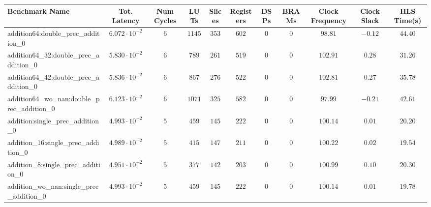 \begin{tabular}{|l|c|c|c|c|c|c|c|c|c|c|}
\hline
Benchmark Name                                            & Tot. Latency            & Num Cycles & LUTs       & Slices    & Registers & DSPs    & BRAMs & Clock Frequency & Clock Slack & HLS Time(s) \\
\hline
addition64:double\_prec\_addition\_0                      & $ 6.072 \cdot 10^{-2} $ & $ 6      $ & $ 1145   $ & $ 353   $ & $ 602   $ & $ 0   $ & $ 0 $ & $ 98.81       $ & $ -0.12   $ & $ 44.40   $ \\
addition64\_32:double\_prec\_addition\_0                  & $ 5.830 \cdot 10^{-2} $ & $ 6      $ & $ 789    $ & $ 261   $ & $ 519   $ & $ 0   $ & $ 0 $ & $ 102.91      $ & $ 0.28    $ & $ 31.26   $ \\
addition64\_42:double\_prec\_addition\_0                  & $ 5.836 \cdot 10^{-2} $ & $ 6      $ & $ 867    $ & $ 276   $ & $ 522   $ & $ 0   $ & $ 0 $ & $ 102.81      $ & $ 0.27    $ & $ 35.78   $ \\
addition64\_wo\_nan:double\_prec\_addition\_0             & $ 6.123 \cdot 10^{-2} $ & $ 6      $ & $ 1071   $ & $ 325   $ & $ 582   $ & $ 0   $ & $ 0 $ & $ 97.99       $ & $ -0.21   $ & $ 42.61   $ \\
addition:single\_prec\_addition\_0                        & $ 4.993 \cdot 10^{-2} $ & $ 5      $ & $ 459    $ & $ 145   $ & $ 222   $ & $ 0   $ & $ 0 $ & $ 100.14      $ & $ 0.01    $ & $ 20.20   $ \\
addition\_16:single\_prec\_addition\_0                    & $ 4.989 \cdot 10^{-2} $ & $ 5      $ & $ 415    $ & $ 147   $ & $ 211   $ & $ 0   $ & $ 0 $ & $ 100.22      $ & $ 0.02    $ & $ 19.54   $ \\
addition\_8:single\_prec\_addition\_0                     & $ 4.951 \cdot 10^{-2} $ & $ 5      $ & $ 377    $ & $ 142   $ & $ 203   $ & $ 0   $ & $ 0 $ & $ 100.99      $ & $ 0.10    $ & $ 20.30   $ \\
addition\_wo\_nan:single\_prec\_addition\_0               & $ 4.993 \cdot 10^{-2} $ & $ 5      $ & $ 459    $ & $ 145   $ & $ 222   $ & $ 0   $ & $ 0 $ & $ 100.14      $ & $ 0.01    $ & $ 19.78   $ \\

\end{tabular}
